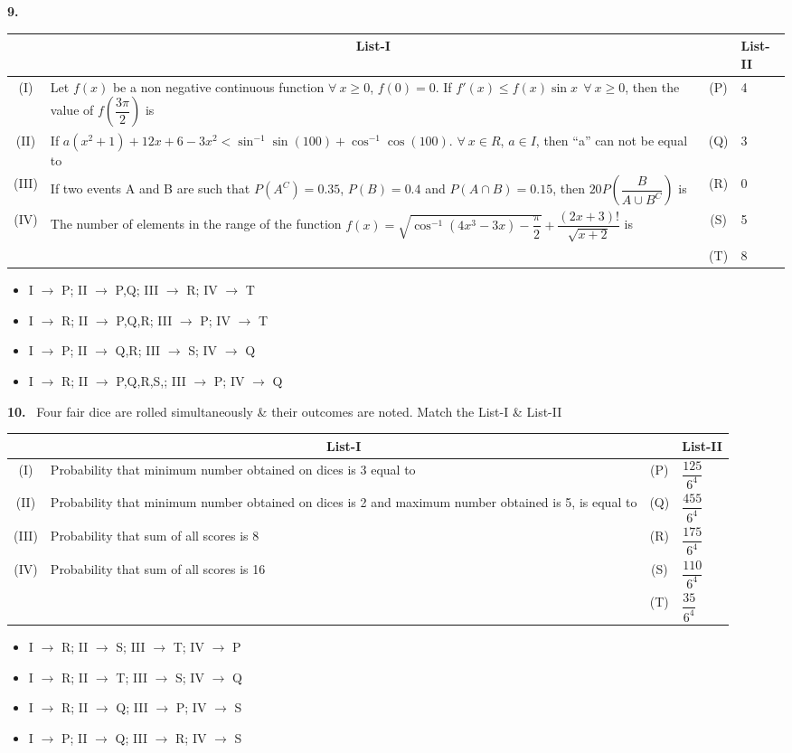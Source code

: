 \documentclass[10pt]{extarticle}
\newcommand{\qn}[1]{\par\smallskip\noindent\textbf{#1.}~}
\newenvironment{qoptions}{\begin{itemize}[leftmargin=1.8em,itemsep=1pt,topsep=2pt,label={}]}{\end{itemize}}
\newcommand{\opt}[2]{\item[(#1)] #2}
\begin{document}
\begin{multicols}{2}
\qn{9}\par\nobreak
\begin{center}\small\setlength{\tabcolsep}{3pt}
\begin{tabular}{|c|p{4.2cm}|c|p{1.0cm}|}
\hline
 & \multicolumn{1}{c|}{\textbf{List-I}} & & \textbf{\footnotesize List-II} \\
\hline
(I) & Let $f(x)$ be a non negative continuous function $\forall\ x\ge0$, $f(0)=0$. If $f'(x)\le f(x)\sin x\ \ \forall\ x\ge0$, then the value of $f\left(\dfrac{3\pi}2\right)$ is & (P) & 4 \\
\hline
(II) & If $a(x^2+1)+12x+6-3x^2<\sin^{-1}\sin(100)+\cos^{-1}\cos(100)$. $\forall\ x\in R$, $a\in I$, then ``a'' can not be equal to & (Q) & 3 \\
\hline
(III) & If two events A and B are such that $P(A^C)=0.35$, $P(B)=0.4$ and $P(A\cap B)=0.15$, then $20P\left(\dfrac{B}{A\cup B^C}\right)$ is & (R) & 0 \\
\hline
(IV) & The number of elements in the range of the function $f(x)=\sqrt{\cos^{-1}\left(4x^3-3x\right)-\dfrac\pi2}+\dfrac{(2x+3)!}{\sqrt{x+2}}$ is & (S) & 5 \\
\hline
 & & (T) & 8 \\
\hline
\end{tabular}
\end{center}
\begin{qoptions}
\opt{A}{I $\to$ P; II $\to$ P,Q; III $\to$ R; IV $\to$ T}
\opt{B}{I $\to$ R; II $\to$ P,Q,R; III $\to$ P; IV $\to$ T}
\opt{C}{I $\to$ P; II $\to$ Q,R; III $\to$ S; IV $\to$ Q}
\opt{D}{I $\to$ R; II $\to$ P,Q,R,S,; III $\to$ P; IV $\to$ Q}
\end{qoptions}

\qn{10} Four fair dice are rolled simultaneously \& their outcomes are noted. Match the List-I \& List-II\par\nobreak
\begin{center}\small\setlength{\tabcolsep}{3pt}
\begin{tabular}{|c|p{4.1cm}|c|p{1.1cm}|}
\hline
 & \multicolumn{1}{c|}{\textbf{List-I}} & & \textbf{\footnotesize List-II} \\
\hline
(I) & Probability that minimum number obtained on dices is 3 equal to & (P) & $\dfrac{125}{6^4}$ \\
\hline
(II) & Probability that minimum number obtained on dices is 2 and maximum number obtained is 5, is equal to & (Q) & $\dfrac{455}{6^4}$ \\
\hline
(III) & Probability that sum of all scores is 8 & (R) & $\dfrac{175}{6^4}$ \\
\hline
(IV) & Probability that sum of all scores is 16 & (S) & $\dfrac{110}{6^4}$ \\
\hline
 & & (T) & $\dfrac{35}{6^4}$ \\
\hline
\end{tabular}
\end{center}
\begin{qoptions}
\opt{A}{I $\to$ R; II $\to$ S; III $\to$ T; IV $\to$ P}
\opt{B}{I $\to$ R; II $\to$ T; III $\to$ S; IV $\to$ Q}
\opt{C}{I $\to$ R; II $\to$ Q; III $\to$ P; IV $\to$ S}
\opt{D}{I $\to$ P; II $\to$ Q; III $\to$ R; IV $\to$ S}
\end{qoptions}


\end{multicols}
\end{document}
